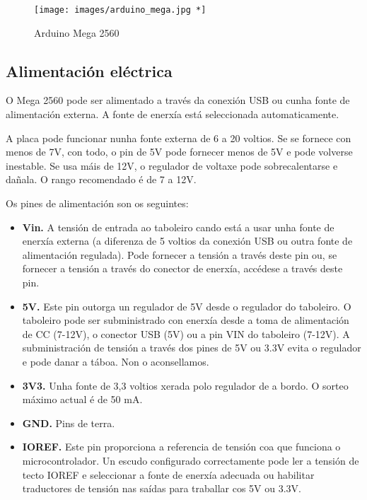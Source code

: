 \documentclass[11pt,twoside]{book}
\begin{document}
\begin{figure}[H]
	\begin{center}
		\texttt{[image: images/arduino\_mega.jpg *]}
	\end{center}
	\caption{Arduino Mega 2560}
	\label{fig:ArduinoMega}
\end{figure}

\subsection{Alimentación eléctrica}

O Mega 2560 pode ser alimentado a través da conexión USB ou cunha fonte de alimentación externa. A fonte de enerxía está seleccionada automaticamente. 

A placa pode funcionar nunha fonte externa de 6 a 20 voltios. Se se fornece con menos de 7V, con todo, o pin de 5V pode fornecer menos de 5V e pode volverse inestable. Se usa máis de 12V, o regulador de voltaxe pode sobrecalentarse e dañala. O rango recomendado é de 7 a 12V.

Os pines de alimentación son os seguintes:

\begin{itemize}
\item \textbf{Vin.} A tensión de entrada ao taboleiro cando está a usar unha fonte de enerxía externa (a diferenza de 5 voltios da conexión USB ou outra fonte de alimentación regulada). Pode fornecer a tensión a través deste pin ou, se fornecer a tensión a través do conector de enerxía, accédese a través deste pin.
\item \textbf{5V.} Este pin outorga un regulador de 5V desde o regulador do taboleiro. O taboleiro pode ser subministrado con enerxía desde a toma de alimentación de CC (7-12V), o conector USB (5V) ou a pin VIN do taboleiro (7-12V). A subministración de tensión a través dos pines de 5V ou 3.3V evita o regulador e pode danar a táboa. Non o aconsellamos.
\item \textbf{3V3.} Unha fonte de 3,3 voltios xerada polo regulador de a bordo. O sorteo máximo actual é de 50 mA.
\item \textbf{GND.} Pins de terra.
\item \textbf{IOREF.} Este pin proporciona a referencia de tensión coa que funciona o microcontrolador. Un escudo configurado correctamente pode ler a tensión de tecto IOREF e seleccionar a fonte de enerxía adecuada ou habilitar traductores de tensión nas saídas para traballar cos 5V ou 3.3V.
\end{itemize}
\end{document}
